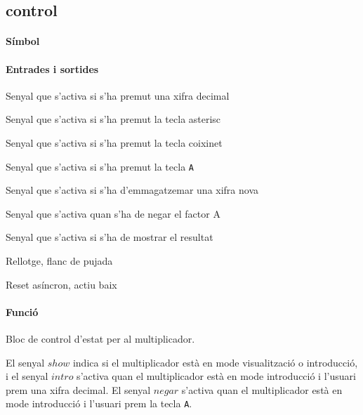 \subsection{\label{sub:\projectname-control} \textsf{control}}

\paragraph{Símbol}

\begin{center}  \end{center}

\paragraph{Entrades i sortides}

\begin{where}
\item[\nodenamebit{bcd}] Senyal que s'activa si s'ha premut una xifra decimal
\item[\nodenamebit{ast}] Senyal que s'activa si s'ha premut la tecla asterisc
\item[\nodenamebit{coi}] Senyal que s'activa si s'ha premut la tecla coixinet
\item[\nodenamebit{neg}] Senyal que s'activa si s'ha premut la tecla \texttt{A}
\item[\nodenamebit{intro}] Senyal que s'activa si s'ha d'emmagatzemar una xifra nova
\item[\nodenamebit{negar}] Senyal que s'activa quan s'ha de negar el factor A
\item[\nodenamebit{show}] Senyal que s'activa si s'ha de mostrar el resultat
\item[\nodenamebit{clk}] Rellotge, flanc de pujada
\item[\nodenamebit{nrst}] Reset asíncron, actiu baix
\end{where}

\paragraph{Funció}

Bloc de control d'estat per al multiplicador.

El senyal $show$ indica si el multiplicador està en mode visualització o introducció,
i el senyal $intro$ s'activa quan el multiplicador està en mode introducció i l'usuari
prem una xifra decimal. El senyal $negar$ s'activa quan el multiplicador està en mode
introducció i l'usuari prem la tecla \texttt{A}.


